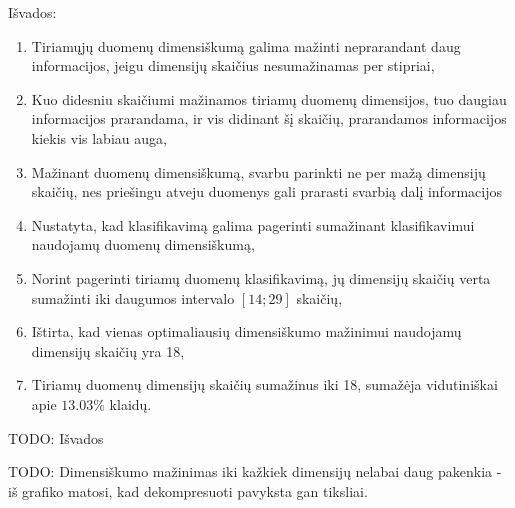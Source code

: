 \documentclass{VUMIFPSbakalaurinis}
\newcommand{\TODO}[1]{
\colorbox{todo-background-color}{TODO: #1}
}
\begin{document}
Išvados:
\begin{enumerate}
	\item Tiriamųjų duomenų dimensiškumą galima mažinti neprarandant daug informacijos, jeigu dimensijų skaičius nesumažinamas per stipriai,
	\item Kuo didesniu skaičiumi mažinamos tiriamų duomenų dimensijos, tuo daugiau informacijos prarandama, ir vis didinant šį skaičių, prarandamos informacijos kiekis vis labiau auga,
	\item Mažinant duomenų dimensiškumą, svarbu parinkti ne per mažą dimensijų skaičių, nes priešingu atveju duomenys gali prarasti svarbią dalį informacijos
	\item Nustatyta, kad klasifikavimą galima pagerinti sumažinant klasifikavimui naudojamų duomenų dimensiškumą,
	\item Norint pagerinti tiriamų duomenų klasifikavimą, jų dimensijų skaičių verta sumažinti iki daugumos intervalo $[14; 29]$ skaičių,
	\item Ištirta, kad vienas optimaliausių dimensiškumo mažinimui naudojamų dimensijų skaičių yra 18,
	\item Tiriamų duomenų dimensijų skaičių sumažinus iki 18, sumažėja vidutiniškai apie $13.03\%$ klaidų.
\end{enumerate}


\TODO{Išvados}


\TODO{Dimensiškumo mažinimas iki kažkiek dimensijų nelabai daug pakenkia - iš grafiko matosi, kad dekompresuoti pavyksta gan tiksliai.}



\printbibliography[heading=bibintoc]  %

\end{document}
